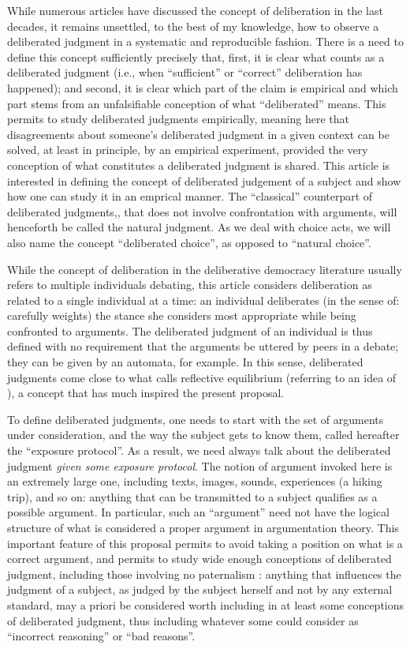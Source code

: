 \documentclass[version=last, pagesize, twoside=off, bibliography=totoc, DIV=calc, fontsize=12pt, a4paper, french, english]{scrartcl}
\begin{document}
While numerous articles have discussed the concept of deliberation in the last decades, it remains unsettled, to the best of my knowledge, how to observe a deliberated judgment in a systematic and reproducible fashion. There is a need to define this concept sufficiently precisely that, first, it is clear what counts as a deliberated judgment (i.e., when “sufficient” \citep{meinard_justification_2020} or “correct” deliberation has happened); and second, it is clear which part of the claim is empirical and which part stems from an unfalsifiable conception of what “deliberated” means. This permits to study deliberated judgments empirically, meaning here that disagreements about someone’s deliberated judgment in a given context can be solved, at least in principle, by an empirical experiment, provided the very conception of what constitutes a deliberated judgment is shared. This article is interested in defining the concept of deliberated judgement of a subject and show how one can study it in an emprical manner. The “classical” counterpart of deliberated judgments,, that does not involve confrontation with arguments, will henceforth be called the natural judgment. As we deal with choice acts, we will also name the concept “deliberated choice”, as opposed to “natural choice”.

While the concept of deliberation in the deliberative democracy literature usually refers to multiple individuals debating, this article considers deliberation as related to a single individual at a time: an individual deliberates (in the sense of: carefully weights) the stance she considers most appropriate while being confronted to arguments. The deliberated judgment of an individual is thus defined with no requirement that the arguments be uttered by peers in a debate; they can be given by an automata, for example. In this sense, deliberated judgments come close to what \citet{rawls_theory_1999} calls reflective equilibrium (referring to an idea of \citet{goodman_fact_1983}), a concept that has much inspired the present proposal.

To define deliberated judgments, one needs to start with the set of arguments under consideration, and the way the subject gets to know them, called hereafter the “exposure protocol”. As a result, we need always talk about the deliberated judgment \emph{given some exposure protocol}. The notion of argument invoked here is an extremely large one, including texts, images, sounds, experiences (a hiking trip), and so on: anything that can be transmitted to a subject qualifies as a possible argument. In particular, such an “argument” need not have the logical structure of what is considered a proper argument in argumentation theory. This important feature of this proposal permits to avoid taking a position on what is a correct argument, and permits to study wide enough conceptions of deliberated judgment, including those involving no paternalism \citep{cailloux_formal_2020}: anything that influences the judgment of a subject, as judged by the subject herself and not by any external standard, may a priori be considered worth including in at least some conceptions of deliberated judgment, thus including whatever some could consider as “incorrect reasoning” or “bad reasons”.
\end{document}
